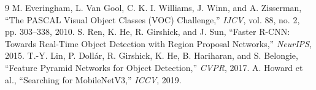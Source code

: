 \documentclass[twoside,final]{hcmut-report}
\begin{document}
\begin{thebibliography}{9}
 M. Everingham, L. Van Gool, C. K. I. Williams, J. Winn, and A. Zisserman, ``The PASCAL Visual Object Classes (VOC) Challenge,'' \textit{IJCV}, vol. 88, no. 2, pp. 303--338, 2010.
 S. Ren, K. He, R. Girshick, and J. Sun, ``Faster R-CNN: Towards Real-Time Object Detection with Region Proposal Networks,'' \textit{NeurIPS}, 2015.
 T.-Y. Lin, P. Dollár, R. Girshick, K. He, B. Hariharan, and S. Belongie, ``Feature Pyramid Networks for Object Detection,'' \textit{CVPR}, 2017.
 A. Howard et al., ``Searching for MobileNetV3,'' \textit{ICCV}, 2019.
\end{thebibliography}
\end{document}
